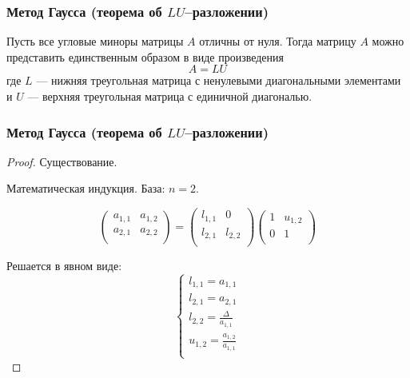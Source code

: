 \documentclass[10pt]{beamer}
\begin{document}
\begin{frame}[fragile]
\frametitle{Метод Гаусса (теорема об $LU$--разложении)}

\begin{theorem}
Пусть все угловые миноры матрицы $A$ отличны от нуля. Тогда матрицу $A$ можно представить единственным образом в виде произведения
$$A = L U$$
где $L$ --- нижняя треугольная матрица с ненулевыми диагональными элементами и $U$ --- верхняя треугольная матрица с единичной диагональю.
\end{theorem}
\end{frame}

\begin{frame}[fragile]
\frametitle{Метод Гаусса (теорема об $LU$--разложении)}

\begin{proof}

Существование.

Математическая индукция. База: $n = 2$.

$$
\begin{pmatrix}
a_{1,1} & a_{1,2} \\
a_{2,1} & a_{2,2} \\
\end{pmatrix}
=
\begin{pmatrix}
l_{1,1} & 0 \\
l_{2,1} & l_{2,2} \\
\end{pmatrix}
\begin{pmatrix}
1 & u_{1,2} \\
0 & 1 \\
\end{pmatrix}
$$

Решается в явном виде:
$$
\begin{cases}
l_{1, 1} = a_{1, 1}\\
l_{2, 1} = a_{2, 1}\\
l_{2, 2} = \frac{\Delta}{a_{1, 1}}\\
u_{1, 2} = \frac{a_{1, 2}}{a_{1, 1}}\\
\end{cases}
$$
\end{proof}

\end{frame}
\end{document}

